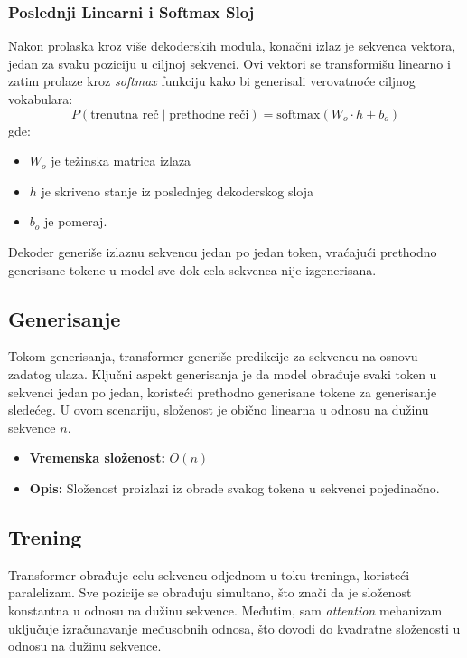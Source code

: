 \documentclass[12pt]{article}
\begin{document}
   \subsubsection*{Poslednji Linearni i Softmax Sloj}
   Nakon prolaska kroz više dekoderskih modula, konačni izlaz je sekvenca vektora, 
   jedan za svaku poziciju u ciljnoj sekvenci. Ovi vektori se transformišu 
   linearno i zatim prolaze kroz \textit{softmax} funkciju kako bi generisali verovatnoće 
   ciljnog vokabulara:
   \[
   P(\text{trenutna reč} \mid \text{prethodne reči}) = \text{softmax}(W_o \cdot h + b_o)
   \]
   \newpage
   gde:
   \begin{itemize}
      \vspace{-0.5cm}
      \setlength\itemsep{0.2em} %
      \item \( W_o \) je težinska matrica izlaza
      \item \( h \) je skriveno stanje iz poslednjeg dekoderskog sloja
      \item \( b_o \) je pomeraj.
   \end{itemize}
   Dekoder generiše izlaznu sekvencu jedan po jedan token, vraćajući prethodno 
   generisane tokene u model sve dok cela sekvenca nije izgenerisana.

   \subsection{Generisanje}
   Tokom generisanja, transformer generiše predikcije za sekvencu na osnovu zadatog ulaza. 
   Ključni aspekt generisanja je da model obrađuje svaki token u sekvenci jedan po jedan, 
   koristeći prethodno generisane tokene za generisanje sledećeg. U ovom scenariju, 
   složenost je obično linearna u odnosu na dužinu sekvence \(n\).

   \begin{itemize}
       \item \textbf{Vremenska složenost:} \(O(n)\)
       \item \textbf{Opis:} Složenost proizlazi iz obrade svakog tokena u sekvenci pojedinačno.
   \end{itemize}

   \subsection{Trening}
   Transformer obrađuje celu sekvencu odjednom u toku treninga, koristeći paralelizam. 
   Sve pozicije se obrađuju simultano, što znači da je složenost konstantna u odnosu 
   na dužinu sekvence. Međutim, sam \textit{attention} mehanizam uključuje 
   izračunavanje međusobnih odnosa, što dovodi do kvadratne složenosti u odnosu 
   na dužinu sekvence.
\end{document}
